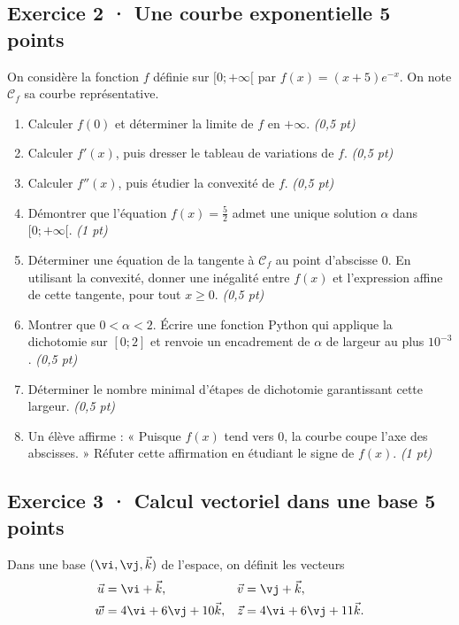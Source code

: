 \subsection*{Exercice 2 · Une courbe exponentielle \hfill 5 points}On considère la fonction $f$ définie sur $[0;+\infty[$ par $f(x)=(x+5)e^{-x}$. On note $\mathcal C_f$ sa courbe représentative.

\begin{enumerate}

\item Calculer $f(0)$ et déterminer la limite de $f$ en $+\infty$. \hfill\textit{(0,5 pt)}

\item Calculer $f' (x)$, puis dresser le tableau de variations de $f$. \hfill\textit{(0,5 pt)}

\item Calculer $f'' (x)$, puis étudier la convexité de $f$. \hfill\textit{(0,5 pt)}

\item Démontrer que l'équation $f(x)=\frac{5}{2}$ admet une unique solution $\alpha$ dans $[0;+\infty[$. \hfill\textit{(1 pt)}

\item Déterminer une équation de la tangente à $\mathcal C_f$ au point d'abscisse $0$. En utilisant la convexité, donner une inégalité entre $f(x)$ et l'expression affine de cette tangente, pour tout $x\ge0$. \hfill\textit{(0,5 pt)}

\item Montrer que $0<\alpha<2$. Écrire une fonction Python qui applique la dichotomie sur $[0;2]$ et renvoie un encadrement de $\alpha$ de largeur au plus $10^{-3}$. \hfill\textit{(0,5 pt)}

\item Déterminer le nombre minimal d'étapes de dichotomie garantissant cette largeur. \hfill\textit{(0,5 pt)}

\item Un élève affirme : « Puisque $f(x)$ tend vers $0$, la courbe coupe l'axe des abscisses. » Réfuter cette affirmation en étudiant le signe de $f(x)$. \hfill\textit{(1 pt)}

\end{enumerate}

\clearpage{}\par

\subsection*{Exercice 3 · Calcul vectoriel dans une base \hfill 5 points}Dans une base $(\vi,\vj,\vec k)$ de l'espace, on définit les vecteurs
\[\begin{aligned}\vec u&=\vi+\vec k,&\vec v&=\vj+\vec k,\\
\vec w&=4\vi+6\vj+10\vec k,&\vec z&=4\vi+6\vj+11\vec k.\end{aligned}\]


